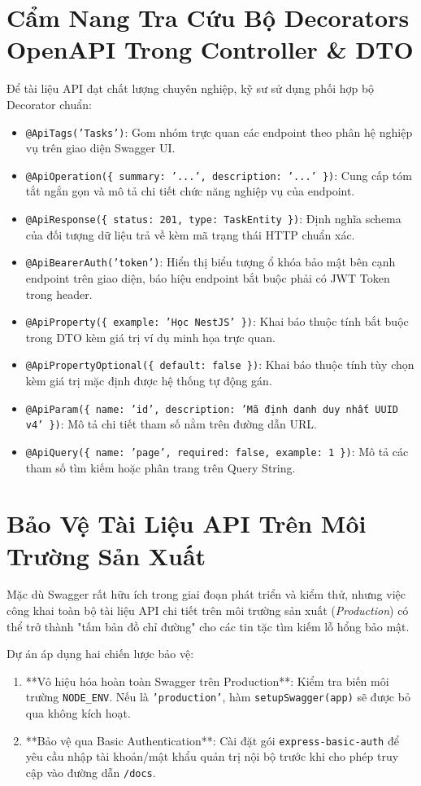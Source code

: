 \documentclass[12pt,a4paper,oneside]{book}
\begin{document}
\section{Cẩm Nang Tra Cứu Bộ Decorators OpenAPI Trong Controller \& DTO}
Để tài liệu API đạt chất lượng chuyên nghiệp, kỹ sư sử dụng phối hợp bộ Decorator chuẩn:
\begin{itemize}
  \item \texttt{@ApiTags('Tasks')}: Gom nhóm trực quan các endpoint theo phân hệ nghiệp vụ trên giao diện Swagger UI.
  \item \texttt{@ApiOperation(\{ summary: '...', description: '...' \})}: Cung cấp tóm tắt ngắn gọn và mô tả chi tiết chức năng nghiệp vụ của endpoint.
  \item \texttt{@ApiResponse(\{ status: 201, type: TaskEntity \})}: Định nghĩa schema của đối tượng dữ liệu trả về kèm mã trạng thái HTTP chuẩn xác.
  \item \texttt{@ApiBearerAuth('token')}: Hiển thị biểu tượng ổ khóa bảo mật bên cạnh endpoint trên giao diện, báo hiệu endpoint bắt buộc phải có JWT Token trong header.
  \item \texttt{@ApiProperty(\{ example: 'Học NestJS' \})}: Khai báo thuộc tính bắt buộc trong DTO kèm giá trị ví dụ minh họa trực quan.
  \item \texttt{@ApiPropertyOptional(\{ default: false \})}: Khai báo thuộc tính tùy chọn kèm giá trị mặc định được hệ thống tự động gán.
  \item \texttt{@ApiParam(\{ name: 'id', description: 'Mã định danh duy nhất UUID v4' \})}: Mô tả chi tiết tham số nằm trên đường dẫn URL.
  \item \texttt{@ApiQuery(\{ name: 'page', required: false, example: 1 \})}: Mô tả các tham số tìm kiếm hoặc phân trang trên Query String.
\end{itemize}

\section{Bảo Vệ Tài Liệu API Trên Môi Trường Sản Xuất}
Mặc dù Swagger rất hữu ích trong giai đoạn phát triển và kiểm thử, nhưng việc công khai toàn bộ tài liệu API chi tiết trên môi trường sản xuất (\textit{Production}) có thể trở thành "tấm bản đồ chỉ đường" cho các tin tặc tìm kiếm lỗ hổng bảo mật.

Dự án áp dụng hai chiến lược bảo vệ:
\begin{enumerate}
  \item **Vô hiệu hóa hoàn toàn Swagger trên Production**: Kiểm tra biến môi trường \texttt{NODE\_ENV}. Nếu là \texttt{'production'}, hàm \texttt{setupSwagger(app)} sẽ được bỏ qua không kích hoạt.
  \item **Bảo vệ qua Basic Authentication**: Cài đặt gói \texttt{express-basic-auth} để yêu cầu nhập tài khoản/mật khẩu quản trị nội bộ trước khi cho phép truy cập vào đường dẫn \texttt{/docs}.
\end{enumerate}
\end{document}
